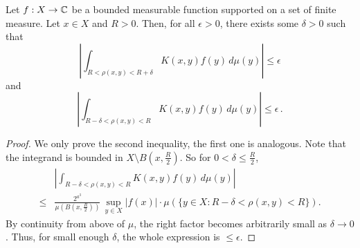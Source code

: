 \begin{lemma} \label{small-annulus}
    \leanok
    Let $f:X\to\mathbb{C}$ be a bounded measurable function supported on a set of finite measure.
    Let $x\in X$ and $R>0$.
    Then, for all $\epsilon>0$, there exists some $\delta>0$ such that
    \begin{equation}
        \left| \int_{R<\rho(x,y)<R+\delta} K(x,y) f(y) \, d\mu(y) \right| \le \epsilon
    \end{equation}
    and
    \begin{equation}
        \left| \int_{R-\delta<\rho(x,y)<R} K(x,y) f(y) \, d\mu(y) \right| \le \epsilon \,.
    \end{equation}
\end{lemma}
\begin{proof}
\leanok
We only prove the second inequality, the first one is analogous.
Note that the integrand is bounded in $X\setminus B(x,\frac{R}{2})$. So for $0<\delta\le\frac{R}{2}$,
\begin{align*}
    &\left| \int_{R-\delta<\rho(x,y)<R} K(x,y) f(y) \, d\mu(y) \right| \\
    \le &\frac{2^{a^3}}{\mu(B(x,\frac{R}{2}))} \, \sup_{y\in X}|f(x)| \cdot \mu(\{y\in X: R-\delta<\rho(x,y)<R\}).
\end{align*}
By continuity from above of $\mu$, the right factor becomes arbitrarily small as $\delta\rightarrow 0$. Thus, for small enough $\delta$, the whole expression is $\le\epsilon$.
\end{proof}

